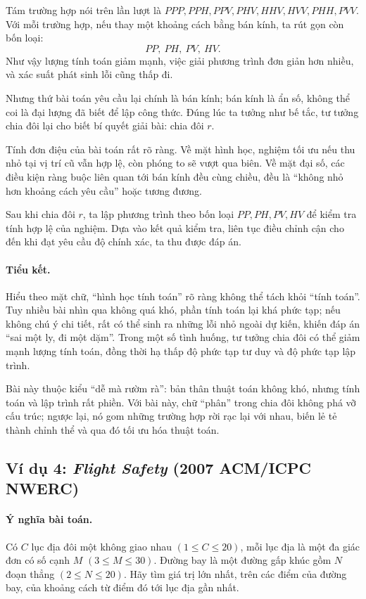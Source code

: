 \documentclass[11pt]{article}
\begin{document}
Tám trường hợp nói trên lần lượt là \(PPP,PPH,PPV,PHV,HHV,HVV,PHH,PVV\).
Với mỗi trường hợp, nếu thay một khoảng cách bằng bán kính, ta rút gọn còn
bốn loại:
\[
  PP,\ PH,\ PV,\ HV.
\]
Như vậy lượng tính toán giảm mạnh, việc giải phương trình đơn giản hơn nhiều,
và xác suất phát sinh lỗi cũng thấp đi.

Nhưng thứ bài toán yêu cầu lại chính là bán kính; bán kính là ẩn số, không
thể coi là đại lượng đã biết để lập công thức. Đúng lúc ta tưởng như bế tắc,
tư tưởng chia đôi lại cho biết bí quyết giải bài: chia đôi \(r\).

Tính đơn điệu của bài toán rất rõ ràng. Về mặt hình học, nghiệm tối ưu nếu
thu nhỏ tại vị trí cũ vẫn hợp lệ, còn phóng to sẽ vượt qua biên. Về mặt đại
số, các điều kiện ràng buộc liên quan tới bán kính đều cùng chiều, đều là
``không nhỏ hơn khoảng cách yêu cầu'' hoặc tương đương.

Sau khi chia đôi \(r\), ta lập phương trình theo bốn loại \(PP,PH,PV,HV\) để
kiểm tra tính hợp lệ của nghiệm. Dựa vào kết quả kiểm tra, liên tục điều chỉnh
cận cho đến khi đạt yêu cầu độ chính xác, ta thu được đáp án.

\paragraph{Tiểu kết.}
Hiểu theo mặt chữ, ``hình học tính toán'' rõ ràng không thể tách khỏi
``tính toán''. Tuy nhiều bài nhìn qua không quá khó, phần tính toán lại khá
phức tạp; nếu không chú ý chi tiết, rất có thể sinh ra những lỗi nhỏ ngoài dự
kiến, khiến đáp án ``sai một ly, đi một dặm''. Trong một số tình huống, tư
tưởng chia đôi có thể giảm mạnh lượng tính toán, đồng thời hạ thấp độ phức
tạp tư duy và độ phức tạp lập trình.

Bài này thuộc kiểu ``dễ mà rườm rà'': bản thân thuật toán không khó, nhưng
tính toán và lập trình rất phiền. Với bài này, chữ ``phân'' trong chia đôi
không phá vỡ cấu trúc; ngược lại, nó gom những trường hợp rời rạc lại với
nhau, biến lẻ tẻ thành chỉnh thể và qua đó tối ưu hóa thuật toán.

\subsection{Ví dụ 4: \textit{Flight Safety} (2007 ACM/ICPC NWERC)}

\paragraph{Ý nghĩa bài toán.}
Có \(C\) lục địa đôi một không giao nhau \((1\le C\le 20)\), mỗi lục địa là
một đa giác đơn có số cạnh \(M\) \((3\le M\le 30)\). Đường bay là một đường
gấp khúc gồm \(N\) đoạn thẳng \((2\le N\le 20)\). Hãy tìm giá trị lớn nhất,
trên các điểm của đường bay, của khoảng cách từ điểm đó tới lục địa gần nhất.
\end{document}
